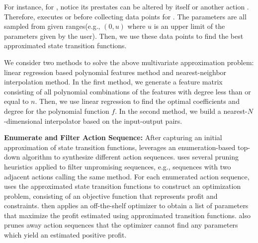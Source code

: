 For instance, for , notice its prestates can be altered by itself or another action . Therefore, {\name} executes  or  before collecting data points for . The parameters are all sampled from given ranges(e.g., $(0, u)$ where $u$ is an upper limit of the parameters given by the user). Then, we use these data points to find the best approximated state transition functions. 

We consider two methods to solve the above multivariate approximation problem: linear regression based polynomial features method and nearest-neighbor interpolation method. In the first method, we generate a feature matrix consisting of all polynomial combinations of the features with degree less than or equal to $n$. Then, we use linear regression to find the optimal coefficients and degree for the polynomial function $f$. In the second method, we build a nearest-$N$-dimensional interpolator based on the input-output pairs. 


\noindent \textbf{Enumerate and Filter Action Sequence: } After capturing an
initial approximation of state transition functions, {\name} leverages an
enumeration-based top-down algorithm to synthesize different action sequences. 
{\name} uses several pruning heuristics applied to filter
unpromising sequences, e.g., sequences with two adjacent actions calling the
same method.
For each enumerated action sequence, {\name} uses the approximated state
transition functions to construct an optimization problem, consisting of an
objective function that represents profit and constraints. {\name} then applies
an off-the-shelf optimizer to obtain a list of parameters that maximize the
profit estimated using approximated transition functions. 
{\name} also prunes away action sequences that the optimizer cannot
find any parameters which yield an estimated positive profit.



